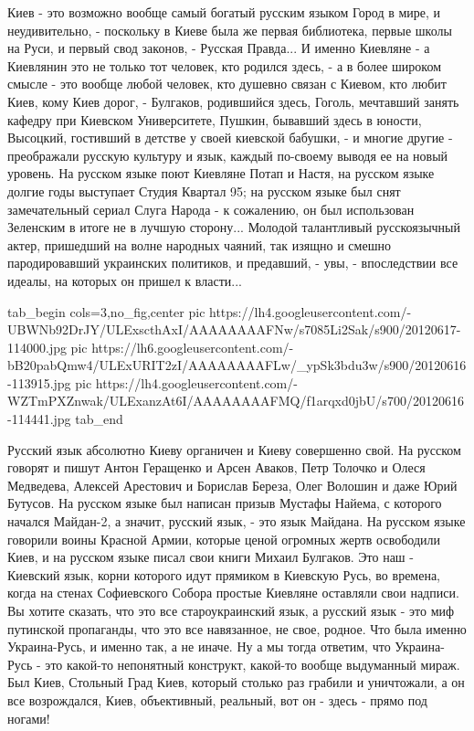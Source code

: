 Киев - это возможно вообще самый богатый русским
языком Город в мире, и неудивительно, - поскольку в Киеве была же первая библиотека, первые школы
на Руси, и первый свод законов, - Русская Правда... И именно Киевляне - а
Киевлянин это не только тот человек, кто родился здесь, - а в более широком
смысле - это вообще любой человек, кто душевно связан с Киевом, кто любит Киев,
кому Киев дорог, - Булгаков, родившийся здесь, Гоголь, мечтавший занять кафедру
при Киевском Университете, Пушкин, бывавший здесь в юности, Высоцкий, гостивший
в детстве у своей киевской бабушки, - и многие другие - преображали русскую
культуру и язык, каждый по-своему выводя ее на новый уровень.  На русском языке
поют Киевляне Потап и Настя, на русском языке долгие годы выступает Студия
Квартал 95; на русском языке был снят замечательный сериал Слуга Народа - к
сожалению, он был использован Зеленским в итоге не в лучшую сторону... Молодой
талантливый русскоязычный актер, пришедший на волне народных чаяний, так изящно
и смешно пародировавший украинских политиков, и предавший, - увы, -
впоследствии все идеалы, на которых он пришел к власти...    

\ifcmt
  tab_begin cols=3,no_fig,center
     pic https://lh4.googleusercontent.com/-UBWNb92DrJY/ULExscthAxI/AAAAAAAAFNw/s7085Li2Sak/s900/20120617-114000.jpg
     pic https://lh6.googleusercontent.com/-bB20pabQmw4/ULExURIT2zI/AAAAAAAAFLw/_ypSk3bdu3w/s900/20120616-113915.jpg
     pic https://lh4.googleusercontent.com/-WZTmPXZnwak/ULExanzAt6I/AAAAAAAAFMQ/f1arqxd0jbU/s700/20120616-114441.jpg
  tab_end
\fi

Русский язык абсолютно Киеву органичен и Киеву совершенно свой. На русском
говорят и пишут Антон Геращенко и Арсен Аваков, Петр Толочко и Олеся Медведева,
Алексей Арестович и Борислав Береза, Олег Волошин и даже Юрий Бутусов. На
русском языке был написан призыв Мустафы Найема, с которого начался Майдан-2, а
значит, русский язык, - это язык Майдана.  На русском языке говорили воины
Красной Армии, которые ценой огромных жертв освободили Киев, и на русском языке
писал свои книги Михаил Булгаков. Это наш - Киевский язык, корни которого идут
прямиком в Киевскую Русь, во времена, когда на стенах Софиевского Собора
простые Киевляне оставляли свои надписи. Вы хотите сказать, что это все
староукраинский язык, а русский язык - это миф путинской пропаганды, что это
все навязанное, не свое, родное. Что была именно Украина-Русь, и именно так, а
не иначе.  Ну а мы тогда ответим, что Украина-Русь - это какой-то непонятный
конструкт, какой-то вообще выдуманный мираж. Был Киев, Стольный Град Киев,
который столько раз грабили и уничтожали, а он все возрождался, Киев,
объективный, реальный, вот он - здесь - прямо под ногами! 

